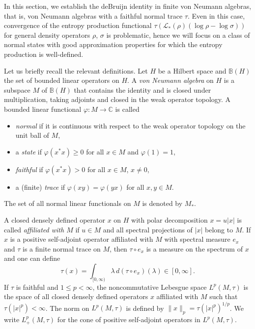 \documentclass[12pt,a4paper]{amsart}
\newcommand{\1}{\mathds{1}}
\renewcommand{\phi}{\varphi}
\renewcommand{\L}{\mathcal L}
\newcommand{\IB}{\mathbb B}
\newcommand{\IC}{\mathbb C}
\newcommand{\abs}[1]{\lvert#1\rvert}
\newcommand{\norm}[1]{\lVert#1\rVert}
\theoremstyle{plain}
\theoremstyle{definition}
\theoremstyle{remark}
\begin{document}
In this section, we establish the deBruijn identity in finite von Neumann algebras, that is, von Neumann algebras with a faithful normal trace $\tau$. Even in this case, convergence of the entropy production functional $\tau(\L_\ast(\rho)(\log \rho-\log\sigma))$ for general density operators $\rho$, $\sigma$ is problematic, hence we will focus on a class of normal states with good approximation properties for which the entropy production is well-defined.

Let us briefly recall the relevant definitions. Let $H$ be a Hilbert space and $\IB(H)$ the set of bounded linear operators on $H$. A \emph{von Neumann algebra} on $H$ is a subspace $M$ of $\IB(H)$ that contains the identity and is closed under multiplication, taking adjoints and closed in the weak operator topology. A bounded linear functional $\phi\colon M\to \IC$ is called
\begin{itemize}
    \item \emph{normal} if it is continuous with respect to the weak operator topology on the unit ball of $M$,
    \item a \emph{state} if $\phi(x^\ast x)\geq 0$ for all $x\in M$ and $\phi(1)=1$,
    \item \emph{faithful} if $\phi(x^\ast x)>0$ for all $x\in M$, $x\ne 0$,
    \item a (finite) \emph{trace} if $\phi(xy)=\phi(yx)$ for all $x,y\in M$.
\end{itemize}
The set of all normal linear functionals on $M$ is denoted by $M_\ast$.

A closed densely defined operator $x$ on $H$ with polar decomposition $x=u\abs{x}$ is called \emph{affiliated with $M$} if $u\in M$ and all spectral projections of $\abs{x}$ belong to $M$. If $x$ is a positive self-adjoint operator affiliated with $M$ with spectral measure $e_x$ and $\tau$ is a finite normal trace on $M$, then $\tau\circ e_x$ is a measure on the spectrum of $x$ and one can define
\begin{equation*}
    \tau(x)=\int_{[0,\infty)}\lambda\,d(\tau\circ e_x)(\lambda)\in [0,\infty].
\end{equation*}
If $\tau$ is faithful and $1\leq p<\infty$, the noncommutative Lebesgue space $L^p(M,\tau)$ is the space of all closed densely defined operators $x$ affiliated with $M$ such that $\tau(\abs{x}^p)<\infty$. The norm on $L^p(M,\tau)$ is defined by $\norm{x}_p=\tau(\abs{x}^p)^{1/p}$. We write $L^p_+(M,\tau)$ for the cone of positive self-adjoint operators in $L^p(M,\tau)$.
\end{document}
